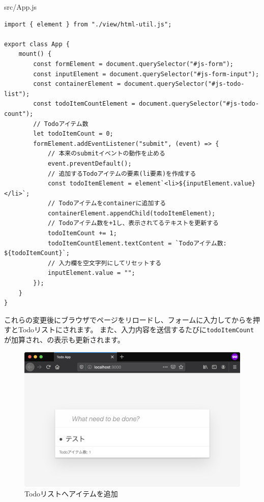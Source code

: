 \begin{listtitle}
src/App.js
\end{listtitle}
\begin{lstlisting}
import { element } from "./view/html-util.js";

export class App {
    mount() {
        const formElement = document.querySelector("#js-form");
        const inputElement = document.querySelector("#js-form-input");
        const containerElement = document.querySelector("#js-todo-list");
        const todoItemCountElement = document.querySelector("#js-todo-count");
        // Todoアイテム数
        let todoItemCount = 0;
        formElement.addEventListener("submit", (event) => {
            // 本来のsubmitイベントの動作を止める
            event.preventDefault();
            // 追加するTodoアイテムの要素(li要素)を作成する
            const todoItemElement = element`<li>${inputElement.value}</li>`;
            // Todoアイテムをcontainerに追加する
            containerElement.appendChild(todoItemElement);
            // Todoアイテム数を+1し、表示されてるテキストを更新する
            todoItemCount += 1;
            todoItemCountElement.textContent = `Todoアイテム数: ${todoItemCount}`;
            // 入力欄を空文字列にしてリセットする
            inputElement.value = "";
        });
    }
}
\end{lstlisting}
\listend

これらの変更後にブラウザでページをリロードし、フォームに入力してからを押すとTodoリストに\textbf{}されます。
また、入力内容を送信するたびに\texttt{todoItemCount}が加算され、\textbf{}の表示も更新されます。

\begin{figure}[h]
\centering
\includegraphics[width=120mm]{./fig/add-todo-item.png}
\caption{Todoリストへアイテムを追加}
\end{figure}


